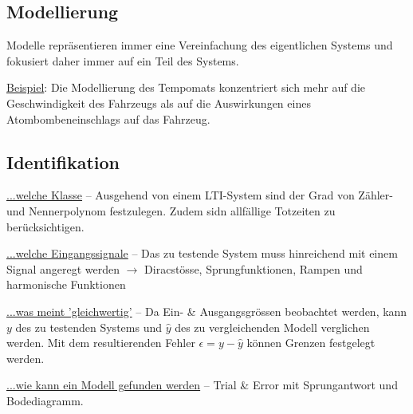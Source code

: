 \documentclass[
  10pt,
  a4paper,
  twocolumn]{article}
\numberwithin{equation}{section}
\begin{document}
\hypertarget{modellierung}{%
\subsection{Modellierung}\label{modellierung}}

\begin{tcolorbox}[enhanced jigsaw, colframe=quarto-callout-important-color-frame, toptitle=1mm, title=\textcolor{quarto-callout-important-color}{\faExclamation}\hspace{0.5em}{Vereinfachung}, bottomtitle=1mm, opacityback=0, left=2mm, opacitybacktitle=0.6, bottomrule=.15mm, leftrule=.75mm, coltitle=black, titlerule=0mm, colback=white, breakable, toprule=.15mm, colbacktitle=quarto-callout-important-color!10!white, rightrule=.15mm, arc=.35mm]

Modelle repräsentieren immer eine Vereinfachung des eigentlichen Systems
und fokusiert daher immer auf ein Teil des Systems.

\vspace{2mm}

\ul{Beispiel}: Die Modellierung des Tempomats konzentriert sich mehr auf
die Geschwindigkeit des Fahrzeugs als auf die Auswirkungen eines
Atombombeneinschlags auf das Fahrzeug.

\end{tcolorbox}

\hypertarget{identifikation}{%
\subsection{Identifikation}\label{identifikation}}

\underline{\footnotesize{...welche Klasse}} -- Ausgehend von einem
LTI-System sind der Grad von Zähler- und Nennerpolynom festzulegen.
Zudem sidn allfällige Totzeiten zu berücksichtigen.

\underline{\footnotesize{...welche Eingangssignale}} -- Das zu testende
System muss hinreichend mit einem Signal angeregt werden \(\rightarrow\)
Diracstösse, Sprungfunktionen, Rampen und harmonische Funktionen

\underline{\footnotesize{...was meint 'gleichwertig'}} -- Da Ein- \&
Ausgangsgrössen beobachtet werden, kann \(y\) des zu testenden Systems
und \(\hat{y}\) des zu vergleichenden Modell verglichen werden. Mit dem
resultierenden Fehler \(\epsilon = y - \hat{y}\) können Grenzen
festgelegt werden.

\underline{\footnotesize{...wie kann ein Modell gefunden werden}} --
Trial \& Error mit Sprungantwort und Bodediagramm.
\end{document}
